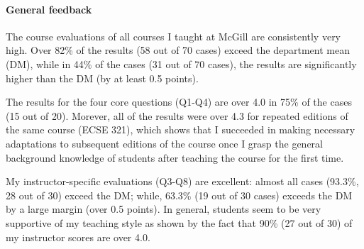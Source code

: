 \documentclass[a4paper,11pt]{report}
\begin{document}
\paragraph{General feedback}
The course evaluations of all courses I taught at McGill are consistently very high. Over 82\% of the results (58 out of 70 cases) exceed the department mean (DM), while in 44\% of the cases (31 out of 70 cases), the results are significantly higher than the DM (by at least 0.5 points). 

The results for the four core questions (Q1-Q4) are over 4.0 in 75\% of the cases (15 out of 20). Morever, all of the results 
were over 4.3 for repeated editions of the same course (ECSE 321), which shows that I succeeded in making necessary 
adaptations to subsequent editions of the course once I grasp the general background knowledge of students after teaching 
the course for the first time. 

My instructor-specific evaluations (Q3-Q8) are excellent: almost all cases (93.3\%, 28 out of 30) exceed the DM; while, 
63.3\% (19 out of 30 cases) exceeds the DM by a large margin (over 0.5 points).  In general, students seem to be very 
supportive of my teaching style as shown by the fact that 90\% (27 out of 30) of my instructor scores are over 4.0.
\end{document}
